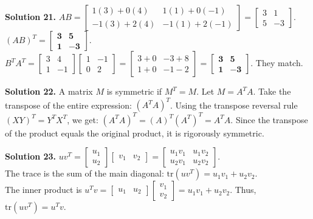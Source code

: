 \documentclass[11pt]{article}
\begin{document}
\vspace{0.2cm}\noindent\textbf{Solution 21.}
$AB = \begin{bmatrix} 1(3)+0(4) & 1(1)+0(-1) \\ -1(3)+2(4) & -1(1)+2(-1) \end{bmatrix} = \begin{bmatrix} 3 & 1 \\ 5 & -3 \end{bmatrix}$. $(AB)^T = \mathbf{\begin{bmatrix} 3 & 5 \\ 1 & -3 \end{bmatrix}}$.\\
$B^T A^T = \begin{bmatrix} 3 & 4 \\ 1 & -1 \end{bmatrix} \begin{bmatrix} 1 & -1 \\ 0 & 2 \end{bmatrix} = \begin{bmatrix} 3+0 & -3+8 \\ 1+0 & -1-2 \end{bmatrix} = \mathbf{\begin{bmatrix} 3 & 5 \\ 1 & -3 \end{bmatrix}}$. They match.

\vspace{0.2cm}\noindent\textbf{Solution 22.}
A matrix $M$ is symmetric if $M^T = M$. Let $M = A^T A$. Take the transpose of the entire expression:
$(A^T A)^T$. Using the transpose reversal rule $(XY)^T = Y^T X^T$, we get:
$(A^T A)^T = (A)^T (A^T)^T = A^T A$. Since the transpose of the product equals the original product, it is rigorously symmetric.

\vspace{0.2cm}\noindent\textbf{Solution 23.}
$uv^T = \begin{bmatrix} u_1 \\ u_2 \end{bmatrix} \begin{bmatrix} v_1 & v_2 \end{bmatrix} = \begin{bmatrix} u_1v_1 & u_1v_2 \\ u_2v_1 & u_2v_2 \end{bmatrix}$.\\
The trace is the sum of the main diagonal: $\text{tr}(uv^T) = u_1v_1 + u_2v_2$.\\
The inner product is $u^T v = \begin{bmatrix} u_1 & u_2 \end{bmatrix} \begin{bmatrix} v_1 \\ v_2 \end{bmatrix} = u_1v_1 + u_2v_2$. Thus, $\text{tr}(uv^T) = u^T v$.
\end{document}
